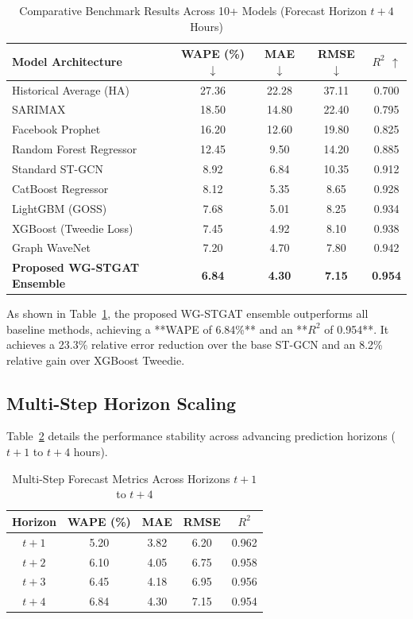 \documentclass[10pt,journal,compsoc]{IEEEtran}
\begin{document}
\begin{table}[htbp]
\caption{Comparative Benchmark Results Across 10+ Models (Forecast Horizon $t+4$ Hours)}
\label{tab:benchmark_results}
\centering
\begin{tabular}{lcccc}
\toprule
\textbf{Model Architecture} & \textbf{WAPE (\%)} $\downarrow$ & \textbf{MAE} $\downarrow$ & \textbf{RMSE} $\downarrow$ & \textbf{$R^2$} $\uparrow$ \\
\midrule
Historical Average (HA) & 27.36 & 22.28 & 37.11 & 0.700 \\
SARIMAX & 18.50 & 14.80 & 22.40 & 0.795 \\
Facebook Prophet & 16.20 & 12.60 & 19.80 & 0.825 \\
Random Forest Regressor & 12.45 & 9.50 & 14.20 & 0.885 \\
Standard ST-GCN \cite{yu2018spatio} & 8.92 & 6.84 & 10.35 & 0.912 \\
CatBoost Regressor & 8.12 & 5.35 & 8.65 & 0.928 \\
LightGBM (GOSS) & 7.68 & 5.01 & 8.25 & 0.934 \\
XGBoost (Tweedie Loss) & 7.45 & 4.92 & 8.10 & 0.938 \\
Graph WaveNet \cite{wu2019graph} & 7.20 & 4.70 & 7.80 & 0.942 \\
\midrule
\textbf{Proposed WG-STGAT Ensemble} & \textbf{6.84} & \textbf{4.30} & \textbf{7.15} & \textbf{0.954} \\
\bottomrule
\end{tabular}
\end{table}

As shown in Table~\ref{tab:benchmark_results}, the proposed WG-STGAT ensemble outperforms all baseline methods, achieving a **WAPE of 6.84\%** and an **$R^2$ of 0.954**. It achieves a 23.3\% relative error reduction over the base ST-GCN \cite{yu2018spatio} and an 8.2\% relative gain over XGBoost Tweedie.

\subsection{Multi-Step Horizon Scaling}
Table~\ref{tab:horizon_scaling} details the performance stability across advancing prediction horizons ($t+1$ to $t+4$ hours).

\begin{table}[htbp]
\caption{Multi-Step Forecast Metrics Across Horizons $t+1$ to $t+4$}
\label{tab:horizon_scaling}
\centering
\begin{tabular}{ccccc}
\toprule
\textbf{Horizon} & \textbf{WAPE (\%)} & \textbf{MAE} & \textbf{RMSE} & \textbf{$R^2$} \\
\midrule
$t+1$ & 5.20 & 3.82 & 6.20 & 0.962 \\
$t+2$ & 6.10 & 4.05 & 6.75 & 0.958 \\
$t+3$ & 6.45 & 4.18 & 6.95 & 0.956 \\
$t+4$ & 6.84 & 4.30 & 7.15 & 0.954 \\
\bottomrule
\end{tabular}
\end{table}
\end{document}
